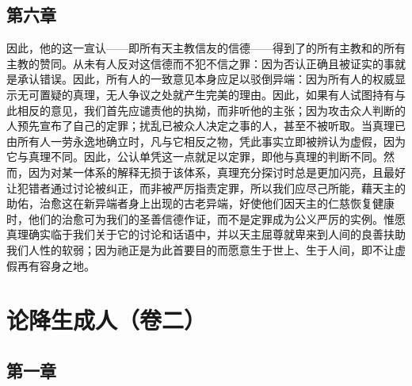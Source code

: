
\subsection{第六章}

\par

因此，他的这一宣认——即所有天主教信友的信德——得到了的所有主教和的所有主教的赞同。从未有人反对这信德而不犯不信之罪：因为否认正确且被证实的事就是承认错误。因此，所有人的一致意见本身应足以驳倒异端：因为所有人的权威显示无可置疑的真理，无人争议之处就产生完美的理由。因此，如果有人试图持有与此相反的意见，我们首先应谴责他的执拗，而非听他的主张；因为攻击众人判断的人预先宣布了自己的定罪；扰乱已被众人决定之事的人，甚至不被听取。当真理已由所有人一劳永逸地确立时，凡与它相反之物，凭此事实立即被辨认为虚假，因为它与真理不同。因此，公认单凭这一点就足以定罪，即他与真理的判断不同。然而，因为对某一体系的解释无损于该体系，真理充分探讨时总是更加闪亮，且最好让犯错者通过讨论被纠正，而非被严厉指责定罪，所以我们应尽己所能，藉天主的助佑，治愈这在新异端者身上出现的古老异端，好使他们因天主的仁慈恢复健康时，他们的治愈可为我们的圣善信德作证，而不是定罪成为公义严厉的实例。惟愿真理确实临于我们关于它的讨论和话语中，并以天主屈尊就卑来到人间的良善扶助我们人性的软弱；因为祂正是为此首要目的而愿意生于世上、生于人间，即不让虚假再有容身之地。\par



\section{论降生成人（卷二）}


\subsection{第一章}

\par

